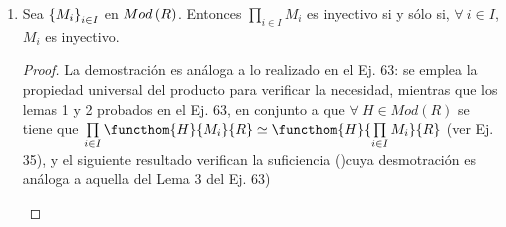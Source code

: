 \documentclass{article}
\begin{document}
\begin{enumerate}[label=\textbf{Ej \arabic*.}]
\begin{proof}
			 \\
			Sean $X,Y$ $R$-módulos y $f\colon X\longrightarrow Y$ mono. Si $h\in \operatorname{Hom}_R(X,Y)$ tenemos el siguiente diagrama\quad
			\\
			que se extiende a un pushout \quad\quad
			\\
			donde $D=(\faktor{X\oplus Y}{W}),\,\, W=\{(fa-ga):a\in R\}, \quad h'(b)=(0,b)+W$ y $g'(c)=(c,0)+W$.\\
			
			Así $f'$ es mono. Por hipótesis existe un morfismo $\beta\colon D\longrightarrow M$ con $\beta f'=1_M$. Definamos $g=\beta  h'$ entonces 
			$g\colon Y\longrightarrow M$ y $gf=\beta  h'f=\beta f'h=h$, por lo que $M$ es inyectivo.\\
			\\
			Como $\operatorname{Hom}_R(\cdot,M)$ es contravariante exacto izquierdo, es suficiente mostrar que $M$ es inyectivo si y sólo si
			$\operatorname{Hom}_R(\cdot,M)$ convierte monomorfismos en epimorfismos:\\
			Si $\alpha\colon A\longrightarrow B$ es mono, entonces $\alpha^*\colon\operatorname{Hom}_R(B,M)\longrightarrow \operatorname{Hom}_R(A,M)$
			es epi si y sólo si para cada $f\in \operatorname{Hom}_R(A,M)$ existe $g\in \operatorname{Hom}_R(B,M)$ tal que $\alpha^*(g)=f$, y esto pasa si y sólo si para cada $f\in \operatorname{Hom}_R(A,M)$
			existe $g\in \operatorname{Hom}_R(B,M)$ tal que $g\alpha=f$, es decir, $M$ es inyectivo.
		\end{proof}
		\item Sea ${\left\{{M}_{i}\right\}}_{i\in I}$ en $Mod\left(R\right)$. Entonces $\prod\limits_{i\in I}M_i$ es inyectivo si y sólo si, $\forall\ i\in I$, $M_i$  es inyectivo.
		\begin{proof}
			La demostración es análoga a lo realizado en el Ej. 63: se emplea la propiedad universal del producto para verificar la necesidad, mientras que los lemas 1 y 2 probados en el Ej. 63, en conjunto a que $\forall\ H\in Mod(R)$ se tiene que $\prod\limits_{i\in I}\functhom{H}{M_i}{R}\simeq\functhom{H}{\prod\limits_{i\in I}M_i}{R}$ (ver Ej. 35), y el siguiente resultado  verifican la suficiencia ()cuya desmotración es análoga a aquella del Lema 3 del Ej. 63)
			\begin{lem}

\end{lem}
\end{proof}
\end{enumerate}
\end{document}
